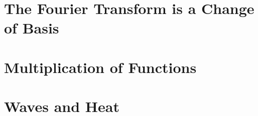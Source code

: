 
\section{The Fourier Transform is a Change of Basis} %
\label{sec:the_fourier_transform_is_a_change_of_basis}


\section{Multiplication of Functions} %
\label{sec:multiplication_of_functions}


\section{Waves and Heat} %
\label{sec:waves_and_heat}

